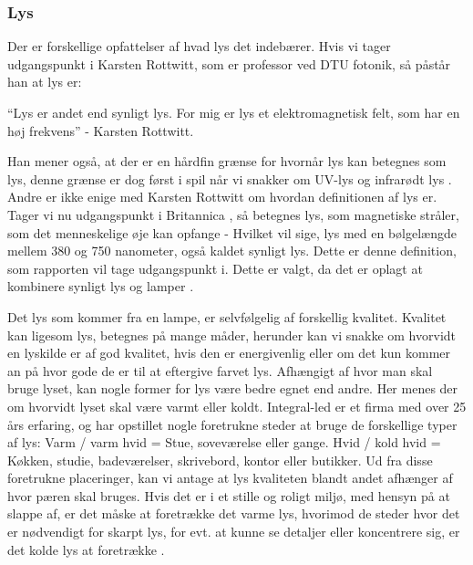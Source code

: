 \subsubsection{Lys}
Der er forskellige opfattelser af hvad lys det indebærer. Hvis vi tager udgangspunkt i Karsten Rottwitt, som er professor ved DTU fotonik, så påstår han at lys er:

“Lys er andet end synligt lys. For mig er lys et elektromagnetisk felt, som har en høj frekvens”
- Karsten Rottwitt.

Han mener også, at der er en hårdfin grænse for hvornår lys kan betegnes som lys, denne grænse er dog først i spil når vi snakker om UV-lys og infrarødt lys \cite{def_lys}. 
Andre er ikke enige med Karsten Rottwitt om hvordan definitionen af lys er. Tager vi nu udgangspunkt i Britannica \cite{britannica_lys}, så betegnes lys, som magnetiske stråler, som det menneskelige øje kan opfange - Hvilket vil sige, lys med en bølgelængde mellem 380 og 750 nanometer, også kaldet synligt lys. 
Dette er denne definition, som rapporten vil tage udgangspunkt i. Dette er valgt, da det er oplagt at kombinere synligt lys og lamper \cite{def_lys}.


Det lys som kommer fra en lampe, er selvfølgelig af forskellig kvalitet. Kvalitet kan ligesom lys, betegnes på mange måder, herunder kan vi snakke om hvorvidt en lyskilde er af god kvalitet, hvis den er energivenlig eller om det kun kommer an på hvor gode de er til at eftergive farvet lys. 
Afhængigt af hvor man skal bruge lyset, kan nogle former for lys være bedre egnet end andre. Her menes der om hvorvidt lyset skal være varmt eller koldt. Integral-led er et firma med over 25 års erfaring, og har opstillet nogle foretrukne steder at bruge de forskellige typer af lys:
Varm / varm hvid = Stue, soveværelse eller gange.
Hvid / kold hvid = Køkken, studie, badeværelser, skrivebord, kontor eller butikker. 
Ud fra disse foretrukne placeringer, kan vi antage at lys kvaliteten blandt andet afhænger af hvor pæren skal bruges. Hvis det er i et stille og roligt miljø, med hensyn på at slappe af, er det måske at foretrække det varme lys, hvorimod de steder hvor det er nødvendigt for skarpt lys, for evt. at kunne se detaljer eller koncentrere sig, er det kolde lys at foretrække \cite{varm_kold}.


